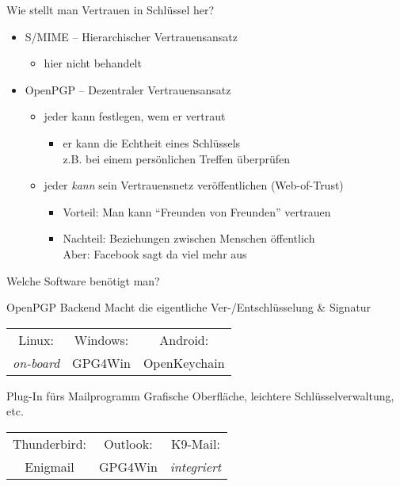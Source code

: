 \begin{frame}{Wie stellt man Vertrauen in Schlüssel her?}
  \begin{itemize}
    \item S/MIME -- Hierarchischer Vertrauensansatz
    \begin{itemize}
      \item hier nicht behandelt
    \end{itemize}
    \item OpenPGP -- Dezentraler Vertrauensansatz
    \begin{itemize}
      \item jeder kann festlegen, wem er vertraut
      \begin{itemize}
        \item er kann die Echtheit eines Schlüssels\\ z.B. bei einem persönlichen Treffen überprüfen
      \end{itemize}
      \item jeder \emph{kann} sein Vertrauensnetz veröffentlichen (Web-of-Trust)
      \begin{itemize}
        \item Vorteil: Man kann ``Freunden von Freunden'' vertrauen
        \item Nachteil: Beziehungen zwischen Menschen öffentlich\\ Aber: Facebook sagt da viel mehr aus
      \end{itemize}
    \end{itemize}
  \end{itemize}
\end{frame}

\begin{frame}{Welche Software benötigt man?}
  \begin{block}{OpenPGP Backend}
    Macht die eigentliche Ver-/Entschlüsselung \& Signatur

    \vspace{1ex}
    \begin{tabular}{ccc}
      Linux:            & Windows: & Android:     \\
      \textit{on-board} & GPG4Win  & OpenKeychain \\
    \end{tabular}
  \end{block}
  \begin{block}{Plug-In fürs Mailprogramm}
    Grafische Oberfläche, leichtere Schlüsselverwaltung, etc.

    \vspace{1ex}
    \begin{tabular}{ccc}
      Thunderbird: & Outlook: & K9-Mail: \\
      Enigmail     & GPG4Win  & \textit{integriert} \\
    \end{tabular}
  \end{block}
\end{frame}

